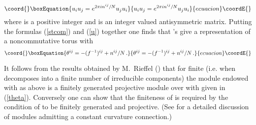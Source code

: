 \documentclass[a4paper,a4paper]{article}
\begin{document}
\begin{equation}\coord{}\boxEquation{ \label{u}
u_{i}u_{j} = e^{2\pi i n^{ij}/N} u_{j}u_{i}
}{ u_{i}u_{j} = e^{2\pi i n^{ij}/N} u_{j}u_{i}
}{ecuacion}\coordE{}\end{equation}
where \coordHE{} is a positive  integer and \coordHE{} is an integer valued antisymmetric matrix. 
Putting the formulas (\ref{stcom}) and (\ref{u}) together one finds that \coordHE{}'s give a representation of a noncommutative torus 
\coordHE{} with 
\begin{equation}\coord{}\boxEquation{ \label{theta}
\theta^{ij} = -(f^{-1})^{ij} + n^{ij}/N \, . 
}{ \theta^{ij} = -(f^{-1})^{ij} + n^{ij}/N \, . 
}{ecuacion}\coordE{}\end{equation}


 It follows from the results obtained by M.~Rieffel (\cite{RieffelProj}) that 
for finite \coordHE{} (i.e. when \coordHE{} decomposes into a finite number of irreducible components) 
 the module \coordHE{} endowed with \coordHE{} as above is a finitely generated projective module over \coordHE{} with 
\myHighlight{$\theta$}\coordHE{} given in (\ref{theta}).  Conversely one can show that the finiteness of \coordHE{} is required by the condition of 
\coordHE{} to be finitely generated and projective. (See \cite{AstSchw} for a detailed discussion of modules admitting a 
constant curvature connection.)

\end{document}
